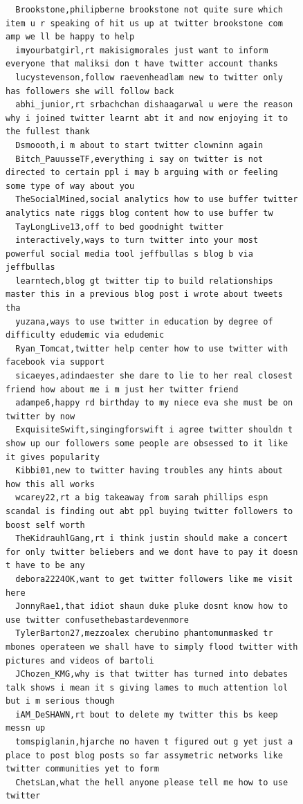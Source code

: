 \begin{figure}[htpb]
\begin{verbatim}
  Brookstone,philipberne brookstone not quite sure which item u r speaking of hit us up at twitter brookstone com amp we ll be happy to help
  imyourbatgirl,rt makisigmorales just want to inform everyone that maliksi don t have twitter account thanks
  lucystevenson,follow raevenheadlam new to twitter only has followers she will follow back
  abhi_junior,rt srbachchan dishaagarwal u were the reason why i joined twitter learnt abt it and now enjoying it to the fullest thank
  Dsmoooth,i m about to start twitter clowninn again
  Bitch_PauusseTF,everything i say on twitter is not directed to certain ppl i may b arguing with or feeling some type of way about you
  TheSocialMined,social analytics how to use buffer twitter analytics nate riggs blog content how to use buffer tw
  TayLongLive13,off to bed goodnight twitter
  interactively,ways to turn twitter into your most powerful social media tool jeffbullas s blog b via jeffbullas
  learntech,blog gt twitter tip to build relationships master this in a previous blog post i wrote about tweets tha
  yuzana,ways to use twitter in education by degree of difficulty edudemic via edudemic
  Ryan_Tomcat,twitter help center how to use twitter with facebook via support
  sicaeyes,adindaester she dare to lie to her real closest friend how about me i m just her twitter friend
  adampe6,happy rd birthday to my niece eva she must be on twitter by now
  ExquisiteSwift,singingforswift i agree twitter shouldn t show up our followers some people are obsessed to it like it gives popularity
  Kibbi01,new to twitter having troubles any hints about how this all works
  wcarey22,rt a big takeaway from sarah phillips espn scandal is finding out abt ppl buying twitter followers to boost self worth
  TheKidrauhlGang,rt i think justin should make a concert for only twitter beliebers and we dont have to pay it doesn t have to be any
  debora2224OK,want to get twitter followers like me visit here
  JonnyRae1,that idiot shaun duke pluke dosnt know how to use twitter confusethebastardevenmore
  TylerBarton27,mezzoalex cherubino phantomunmasked tr mbones operateen we shall have to simply flood twitter with pictures and videos of bartoli
  JChozen_KMG,why is that twitter has turned into debates talk shows i mean it s giving lames to much attention lol but i m serious though
  iAM_DeSHAWN,rt bout to delete my twitter this bs keep messn up
  tomspiglanin,hjarche no haven t figured out g yet just a place to post blog posts so far assymetric networks like twitter communities yet to form
  ChetsLan,what the hell anyone please tell me how to use twitter

\end{verbatim}
\end{figure}
